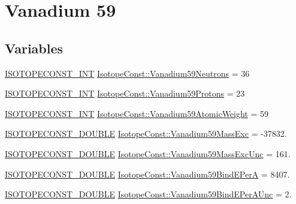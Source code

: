 \hypertarget{group___isotope_const-_vanadium-_v59}{}\section{Vanadium 59}
\label{group___isotope_const-_vanadium-_v59}
\subsection*{Variables}
\begin{DoxyCompactItemize}
\item 
\mbox{\hyperlink{group___isotope_const-_macros_ga5f18360b3e99483a35c32d789e62621c}{I\+S\+O\+T\+O\+P\+E\+C\+O\+N\+S\+T\+\_\+\+I\+NT}} \mbox{\hyperlink{group___isotope_const-_vanadium-_v59_ga67e747d2b61ea8ebdd331f8112ff776b}{Isotope\+Const\+::\+Vanadium59\+Neutrons}} = 36
\item 
\mbox{\hyperlink{group___isotope_const-_macros_ga5f18360b3e99483a35c32d789e62621c}{I\+S\+O\+T\+O\+P\+E\+C\+O\+N\+S\+T\+\_\+\+I\+NT}} \mbox{\hyperlink{group___isotope_const-_vanadium-_v59_ga11f00b82e1a51a5f37f7ca35128c8087}{Isotope\+Const\+::\+Vanadium59\+Protons}} = 23
\item 
\mbox{\hyperlink{group___isotope_const-_macros_ga5f18360b3e99483a35c32d789e62621c}{I\+S\+O\+T\+O\+P\+E\+C\+O\+N\+S\+T\+\_\+\+I\+NT}} \mbox{\hyperlink{group___isotope_const-_vanadium-_v59_ga529fbee0a627ebeaa6d43ffa6ba3124f}{Isotope\+Const\+::\+Vanadium59\+Atomic\+Weight}} = 59
\item 
\mbox{\hyperlink{group___isotope_const-_macros_ga8f45a7272ce02c0b4c65c44636ed719a}{I\+S\+O\+T\+O\+P\+E\+C\+O\+N\+S\+T\+\_\+\+D\+O\+U\+B\+LE}} \mbox{\hyperlink{group___isotope_const-_vanadium-_v59_ga879516dcdad15a704462219644395ab4}{Isotope\+Const\+::\+Vanadium59\+Mass\+Exc}} = -\/37832.
\item 
\mbox{\hyperlink{group___isotope_const-_macros_ga8f45a7272ce02c0b4c65c44636ed719a}{I\+S\+O\+T\+O\+P\+E\+C\+O\+N\+S\+T\+\_\+\+D\+O\+U\+B\+LE}} \mbox{\hyperlink{group___isotope_const-_vanadium-_v59_gad8c540c3b7854a7bf6eb965db69622c7}{Isotope\+Const\+::\+Vanadium59\+Mass\+Exc\+Unc}} = 161.
\item 
\mbox{\hyperlink{group___isotope_const-_macros_ga8f45a7272ce02c0b4c65c44636ed719a}{I\+S\+O\+T\+O\+P\+E\+C\+O\+N\+S\+T\+\_\+\+D\+O\+U\+B\+LE}} \mbox{\hyperlink{group___isotope_const-_vanadium-_v59_gac89d9ac1e801407fee707faf798c95c7}{Isotope\+Const\+::\+Vanadium59\+Bind\+E\+PerA}} = 8407.
\item 
\mbox{\hyperlink{group___isotope_const-_macros_ga8f45a7272ce02c0b4c65c44636ed719a}{I\+S\+O\+T\+O\+P\+E\+C\+O\+N\+S\+T\+\_\+\+D\+O\+U\+B\+LE}} \mbox{\hyperlink{group___isotope_const-_vanadium-_v59_ga3571e3e1d11e7fab6da68bf70d9bd4cf}{Isotope\+Const\+::\+Vanadium59\+Bind\+E\+Per\+A\+Unc}} = 2.

\end{DoxyCompactItemize}
